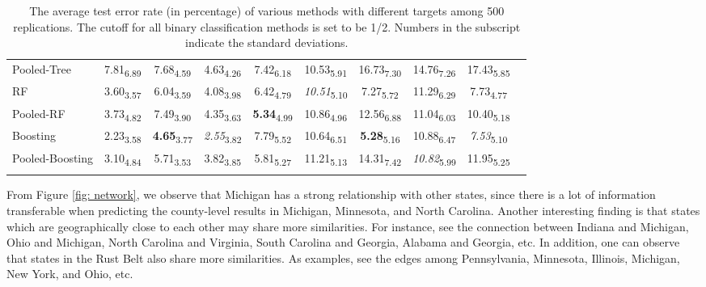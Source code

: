 \documentclass[12pt]{article}
\newcommand{\<}{\langle}
\renewcommand{\>}{\rangle}
\begin{document}
\begin{table}[!h]
\begin{center}
\begin{threeparttable}
{\begin{tabular}{lccccccccc}
Pooled-Tree& \multicolumn{1}{r}{7.81\textsubscript{6.89} }& 7.68\textsubscript{4.59} & 4.63\textsubscript{4.26} & 7.42\textsubscript{6.18} & 10.53\textsubscript{5.91} & 16.73\textsubscript{7.30} & 14.76\textsubscript{7.26} & 17.43\textsubscript{5.85} \\
RF& \multicolumn{1}{r}{3.60\textsubscript{3.57} }& 6.04\textsubscript{3.59} & 4.08\textsubscript{3.98} & 6.42\textsubscript{4.79} & \textit{10.51}\textsubscript{5.10} & 7.27\textsubscript{5.72} & 11.29\textsubscript{6.29} & 7.73\textsubscript{4.77} \\
Pooled-RF& \multicolumn{1}{r}{3.73\textsubscript{4.82} }& 7.49\textsubscript{3.90} & 4.35\textsubscript{3.63} & \textbf{5.34}\textsubscript{4.99} & 10.86\textsubscript{4.96} & 12.56\textsubscript{6.88} & 11.04\textsubscript{6.03} & 10.40\textsubscript{5.18} \\
Boosting& \multicolumn{1}{r}{2.23\textsubscript{3.58} }& \textbf{4.65}\textsubscript{3.77} & \textit{2.55}\textsubscript{3.82} & 7.79\textsubscript{5.52} & 10.64\textsubscript{6.51} & \textbf{5.28}\textsubscript{5.16} & 10.88\textsubscript{6.47} & \textit{7.53}\textsubscript{5.10} \\
Pooled-Boosting& \multicolumn{1}{r}{3.10\textsubscript{4.84} }& 5.71\textsubscript{3.53} & 3.82\textsubscript{3.85} & 5.81\textsubscript{5.27} & 11.21\textsubscript{5.13} & 14.31\textsubscript{7.42} & \textit{10.82}\textsubscript{5.99} & 11.95\textsubscript{5.25} \\
\Xhline{1.25pt}
\end{tabular}}
\end{threeparttable}
\caption{The average test error rate (in percentage) of various methods with different targets among 500 replications. The cutoff for all binary classification methods is set to be 1/2. Numbers in the subscript indicate the standard deviations. }
\label{table: error}
\end{center}
\end{table}

From Figure \ref{fig: network}, we observe that Michigan has a strong relationship with other states, since there is a lot of information transferable when predicting the county-level results in Michigan, Minnesota, and North Carolina. Another interesting finding is that states which are geographically close to each other may share more similarities. For instance, see the connection between Indiana and Michigan, Ohio and Michigan, North Carolina and Virginia, South Carolina and Georgia, Alabama and Georgia, etc. In addition, one can observe that states in the Rust Belt also share more similarities. As examples, see the edges among Pennsylvania, Minnesota, Illinois, Michigan, New York, and Ohio, etc. 
\end{document}
